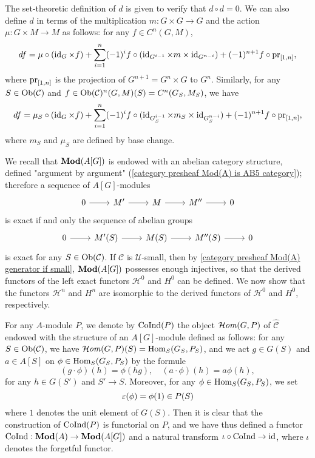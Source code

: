 \begin{remark}
The set-theoretic definition of $d$ is given to verify that $d\circ d=0$. We can also define $d$ in terms of the multiplication $m:G\times G\to G$ and the action $\mu:G\times M\to M$ as follows: for any $f\in C^n(G,M)$,
\[df=\mu\circ(\operatorname{id}_G\times f)+\sum_{i=1}^{n}(-1)^if\circ(\operatorname{id}_{G^{i-1}}\times m\times\operatorname{id}_{G^{n-i}})+(-1)^{n+1}f\circ\mathrm{pr}_{[1,n]},\]
where $\mathrm{pr}_{[1,n]}$ is the projection of $G^{n+1}=G^{n}\times G$ to $G^n$. Similarly, for any $S\in\mathrm{Ob}(\mathcal{C})$ and $f\in\mathrm{Ob}(\mathcal{C})^n(G,M)(S)=C^n(G_S,M_S)$, we have
\[df=\mu_S\circ(\operatorname{id}_G\times f)+\sum_{i=1}^{n}(-1)^if\circ(\operatorname{id}_{G_S^{i-1}}\times m_S\times\operatorname{id}_{G_S^{n-i}})+(-1)^{n+1}f\circ\mathrm{pr}_{[1,n]},\]
where $m_S$ and $\mu_S$ are defined by base change.
\end{remark}

We recall that $\mathbf{Mod}(A[G])$ is endowed with an abelian category structure, defined "argument by argument" (\cref{category presheaf Mod(A) is AB5 category}); therefore a sequence of $A[G]$-modules
\[\begin{tikzcd}
0\ar[r]&M'\ar[r]&M\ar[r]&M''\ar[r]&0
\end{tikzcd}\]
is exact if and only the sequence of abelian groups
\[\begin{tikzcd}
0\ar[r]&M'(S)\ar[r]&M(S)\ar[r]&M''(S)\ar[r]&0
\end{tikzcd}\]
is exact for any $S\in\mathrm{Ob}(\mathcal{C})$. If $\mathcal{C}$ is $\mathscr{U}$-small, then by \cref{category presheaf Mod(A) generator if small}, $\mathbf{Mod}(A[G])$ possesses enough injectives, so that the derived functors of the left exact functors $\mathcal{H}^0$ and $H^0$ can be defined. We now show that the functors $\mathcal{H}^n$ and $H^n$ are isomorphic to the derived functors of $\mathcal{H}^0$ and $H^0$, respectively.

\begin{definition}
For any $A$-module $P$, we denote by $\mathrm{CoInd}(P)$ the object $\operatorname{\mathcal{H}\hspace*{-0.4pt}\textit{om}\hspace{0.5pt}}(G,P)$ of $\widehat{\mathcal{C}}$ endowed with the structure of an $A[G]$-module defined as follows: for any $S\in\mathrm{Ob}(\mathcal{C})$, we have $\operatorname{\mathcal{H}\hspace*{-0.4pt}\textit{om}\hspace{0.5pt}}(G,P)(S)=\mathrm{Hom}_S(G_S,P_S)$, and we act $g\in G(S)$ and $a\in A[S]$ on $\phi\in\mathrm{Hom}_S(G_S,P_S)$ by the formule
\[(g\cdot\phi)(h)=\phi(hg),\quad (a\cdot\phi)(h)=a\phi(h),\]
for any $h\in G(S')$ and $S'\to S$. Moreover, for any $\phi\in\mathrm{Hom}_S(G_S,P_S)$, we set
\[\varepsilon(\phi)=\phi(1)\in P(S)\]
where $1$ denotes the unit element of $G(S)$. Then it is clear that the construction of $\mathrm{CoInd}(P)$ is functorial on $P$, and we have thus defined a functor $\mathrm{CoInd}:\mathbf{Mod}(A)\to\mathbf{Mod}(A[G])$ and a natural transform $\iota\circ\mathrm{CoInd}\to \operatorname{id}$, where $\iota$ denotes the forgetful functor.
\end{definition}

